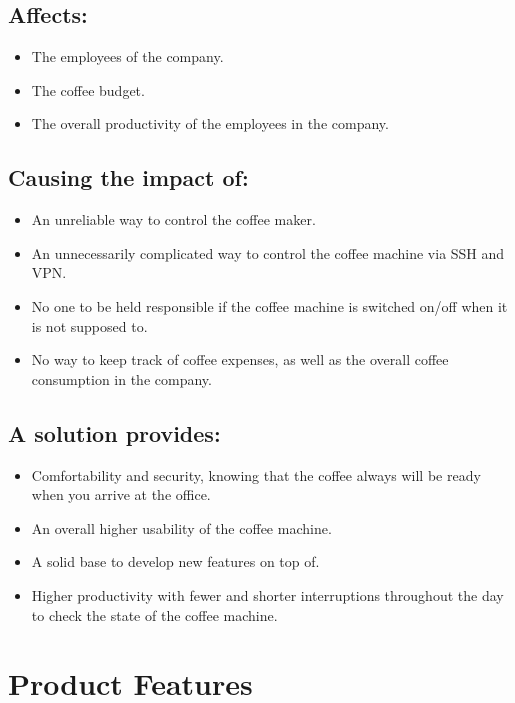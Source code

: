 \subsection{Affects:}

\begin{itemize}
\item The employees of the company.
\item The coffee budget.
\item The overall productivity of the employees in the company.
\end{itemize}

\subsection{Causing the impact of:}

\begin{itemize}
\item An unreliable way to control the coffee maker.
\item An unnecessarily complicated way to control the coffee machine via SSH and VPN.
\item No one to be held responsible if the coffee machine is switched on/off when it is not supposed to.
\item No way to keep track of coffee expenses, as well as the overall coffee consumption in the company.
\end{itemize}

\subsection{A solution provides:}

\begin{itemize}
\item Comfortability and security, knowing that the coffee always will be ready when you arrive at the office.
\item An overall higher usability of the coffee machine.
\item A solid base to develop new features on top of.
\item Higher productivity with fewer and shorter interruptions throughout the day to check the state of the coffee machine.
\end{itemize}

\clearpage

\section{Product Features}

